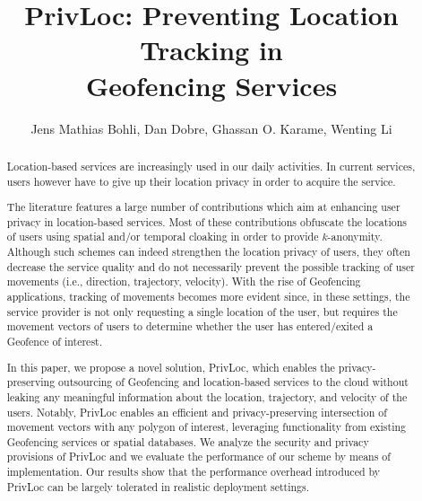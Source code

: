 \documentclass{llncs}
\newcommand\sol{{\sf PrivLoc}}
\begin{document}
\mainmatter
\title{PrivLoc: Preventing Location Tracking in \\Geofencing Services}

\author{Jens Mathias Bohli, Dan Dobre, Ghassan O. Karame, Wenting Li}



\maketitle

\begin{abstract}
Location-based services are increasingly used in our daily activities. In current services, users however have to give up their location privacy in order to acquire the service.

The literature features a large number of contributions which aim at enhancing user privacy in location-based services. Most of these contributions obfuscate the locations of users using spatial and/or temporal cloaking in order to provide $k$-anonymity. Although such schemes can indeed strengthen the location privacy of users, they often decrease the service quality and do not necessarily prevent the possible tracking of user movements (i.e., direction, trajectory, velocity). With the rise of Geofencing
applications, tracking of movements becomes more evident since, in these settings, the service provider is not only requesting a single location of the user, but requires the movement vectors of users to determine whether the user
has entered/exited a Geofence of interest.

In this paper, we propose a novel solution, \sol, which enables the privacy-preserving outsourcing of Geofencing and location-based services to the cloud without leaking any meaningful information about the location, trajectory, and velocity of the users. Notably, \sol{} enables an efficient and privacy-preserving
intersection of movement vectors with any polygon of interest, leveraging
functionality from existing Geofencing services or spatial databases. We analyze the security and privacy provisions of \sol{} and we evaluate the performance of our scheme by means of implementation. Our results show that
the performance overhead introduced by \sol{} can be largely tolerated in realistic deployment settings.

\end{abstract}
\end{document}
